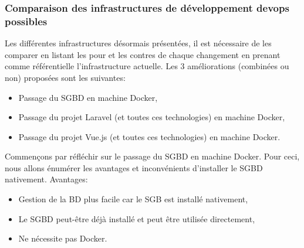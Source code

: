 \documentclass[
    iai, %
    il, %
]{heig-tb}
\begin{document}


\subsubsection{Comparaison des infrastructures de développement \Gls{devops} possibles}
Les différentes infrastructures désormais présentées, il est nécessaire de les comparer en listant les pour et les contres de chaque changement en prenant comme référentielle l'infrastructure actuelle.
Les 3 améliorations (combinées ou non) proposées sont les suivantes:
\begin{itemize}
    \item Passage du SGBD en machine Docker,
    \item Passage du projet Laravel (et toutes ces technologies) en machine Docker,
    \item Passage du projet Vue.js (et toutes ces technologies) en machine Docker.
\end{itemize}



Commençons par réfléchir sur le passage du SGBD en machine Docker.
Pour ceci, nous allons énumérer les avantages et inconvénients d'installer le SGBD nativement.
Avantages:
\begin{itemize}
    \item Gestion de la BD plus facile car le SGB est installé nativement,
    \item Le SGBD peut-être déjà installé et peut être utilisée directement,
    \item Ne nécessite pas Docker.
\end{itemize}
\end{document}

